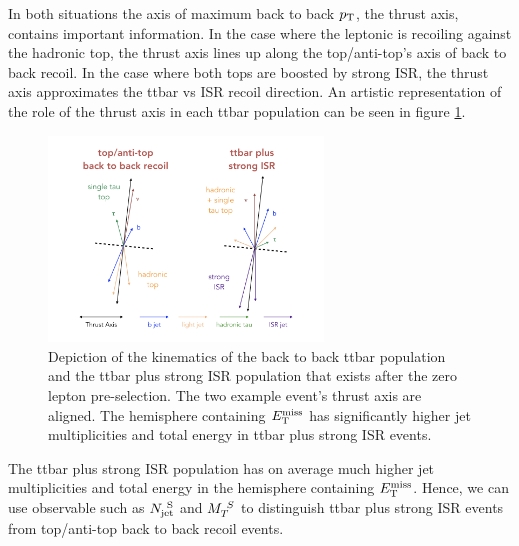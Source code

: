 \indent In both situations the axis of maximum back to back $p_{\mathrm{T}}$, the thrust axis, contains important information.  In the case where the leptonic is recoiling against the hadronic top, the thrust axis lines up along the top/anti-top's axis of back to back recoil.  In the case where both tops are boosted by strong ISR, the thrust axis approximates the ttbar vs ISR recoil direction. An artistic representation of the role of the thrust axis in each ttbar population can be seen in figure \ref{fig:ttbar:2pop}. \\

\begin{figure}[h!]
  \centering
	\includegraphics[width=0.65\textwidth]{./figures/strategy/ttbar_2pop.png}
	\caption{\label{fig:ttbar:2pop}{Depiction of the kinematics of the back to back ttbar population and the ttbar plus strong ISR population that exists after the zero lepton pre-selection. The two example event's thrust axis are aligned.  The hemisphere containing $E_{\mathrm{T}}^{\mathrm{miss}}$ has significantly higher jet multiplicities and total energy in ttbar plus strong ISR events. }}
\end{figure}

\indent The ttbar plus strong ISR population has on average much higher jet multiplicities and total energy in the hemisphere containing $E_{\mathrm{T}}^{\mathrm{miss}}$.  Hence, we can use observable such as $N_{\mathrm{jet}}^{~\mathrm{S}}$ and $M_{T}^{~S}$ to distinguish ttbar plus strong ISR events from top/anti-top back to back recoil events.   \\



